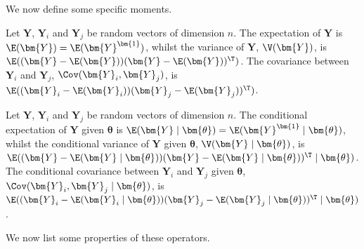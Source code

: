 We now define some specific moments.

\begin{definition}
Let $\bm{Y}$, $\bm{Y}_i$ and $\bm{Y}_j$ be  random vectors of dimension $n$. The expectation of $\bm{Y}$ is $\E(\bm{Y})=\E(\bm{Y}^{\bm{1}})$, whilst the variance of $\bm{Y}$, $\V(\bm{Y})$, is $\E((\bm{Y}-\E(\bm{Y}))(\bm{Y}-\E(\bm{Y}))^\T)$. The covariance between $\bm{Y}_i$ and $\bm{Y}_j$, $\Cov(\bm{Y}_i,\bm{Y}_j)$, is $\E((\bm{Y}_i-\E(\bm{Y}_i))(\bm{Y}_j-\E(\bm{Y}_j))^\T)$. 
\end{definition}

\begin{definition}
Let $\bm{Y}$, $\bm{Y}_i$ and $\bm{Y}_j$ be  random vectors of dimension $n$. The conditional expectation of $\bm{Y}$ given $\bm{\theta}$ is $\E(\bm{Y}\;|\;\bm{\theta})=\E(\bm{Y}^{\bm{1}}\;|\;\bm{\theta})$, whilst the conditional variance of $\bm{Y}$ given $\bm{\theta}$, $\V(\bm{Y}\;|\;\bm{\theta})$, is $\E((\bm{Y}-\E(\bm{Y}\;|\;\bm{\theta}))(\bm{Y}-\E(\bm{Y}\;|\;\bm{\theta}))^\T\;|\;\bm{\theta})$. The conditional covariance between $\bm{Y}_i$ and $\bm{Y}_j$ given $\bm{\theta}$, $\Cov(\bm{Y}_i,\bm{Y}_j\;|\;\bm{\theta})$, is $\E((\bm{Y}_i-\E(\bm{Y}_i\;|\;\bm{\theta}))(\bm{Y}_j-\E(\bm{Y}_j\;|\;\bm{\theta}))^\T\;|\;\bm{\theta})$.
\end{definition}
We now list some properties of these operators.
